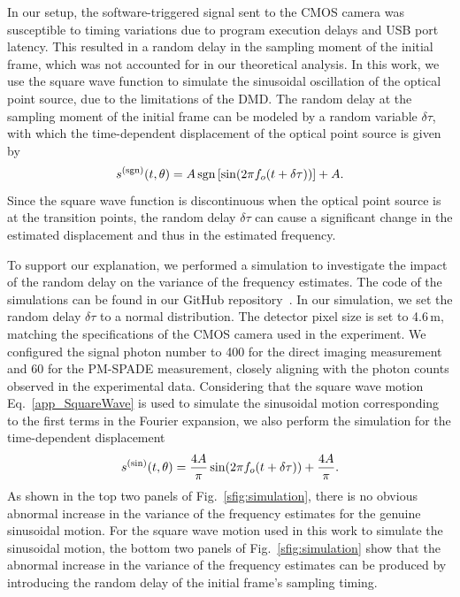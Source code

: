 \documentclass[aps,pra,10pt,showpacs,amsmath,amssymb,floatfix,superscriptaddress,twocolumn]{revtex4-2}
\begin{document}
In our setup, the software-triggered signal sent to the CMOS camera was susceptible to timing variations due to program execution delays and USB port latency.
This resulted in a random delay in the sampling moment of the initial frame, which was not accounted for in our theoretical analysis.
In this work, we use the square wave function to simulate the sinusoidal oscillation of the optical point source, due to the limitations of the DMD.
The random delay at the sampling moment of the initial frame can be modeled by a random variable $\delta\tau$, with which the time-dependent displacement of the optical point source is given by
\begin{equation} \label{app_SquareWave}
  s^{\rm(sgn)}(t,\theta) = A\operatorname{sgn}\qty[\sin(2\pi f_o (t + \delta\tau))] + A.
\end{equation}
Since the square wave function is discontinuous when the optical point source is at the transition points, the random delay $\delta\tau$ can cause a significant change in the estimated displacement and thus in the estimated frequency.

To support our explanation, we performed a simulation to investigate the impact of the random delay on the variance of the frequency estimates.
The code of the simulations can be found in our GitHub repository~\cite{supp_Code}.
In our simulation, we set the random delay $\delta \tau$ to a normal distribution.
The detector pixel size is set to 4.6\,{\textmu}m, matching the specifications of the CMOS camera used in the experiment.
We configured the signal photon number to 400 for the direct imaging measurement and 60 for the PM-SPADE measurement, closely aligning with the photon counts observed in the experimental data.
Considering that the square wave motion Eq.~\eqref{app_SquareWave} is used to simulate the sinusoidal motion corresponding to the first terms in the Fourier expansion, we also perform the simulation for the time-dependent displacement
\begin{equation}
  s^{\rm(sin)}(t,\theta) = \frac{4A}{\pi} \sin(2\pi f_o (t + \delta\tau)) + \frac{4A}{\pi}.
\end{equation}
As shown in the top two panels of Fig.~\ref{sfig:simulation}, there is no obvious abnormal increase in the variance of the frequency estimates for the genuine sinusoidal motion.
For the square wave motion used in this work to simulate the sinusoidal motion, the bottom two panels of Fig.~\ref{sfig:simulation} show that the abnormal increase in the variance of the frequency estimates can be produced by introducing the random delay of the initial frame's sampling timing.
\end{document}
